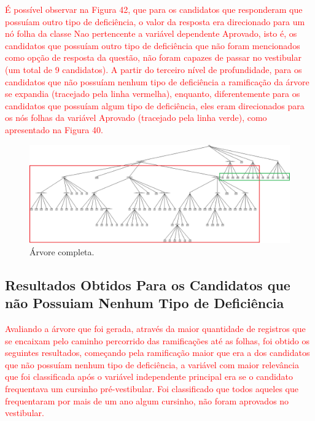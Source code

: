 \par
\textcolor{red}{É possível observar na Figura 42, que para os candidatos que responderam que possuíam outro tipo de deficiência, o valor da resposta era direcionado para um nó folha da classe Nao pertencente a variável dependente Aprovado, isto é, os candidatos que possuíam outro tipo de deficiência que não foram mencionados como opção de resposta da questão, não foram capazes de passar no vestibular (um total de 9 candidatos). A partir do terceiro nível de profundidade, para os candidatos que não possuíam nenhum tipo de deficiência a ramificação da árvore se expandia (tracejado pela linha vermelha), enquanto, diferentemente para os candidatos que possuíam algum tipo de deficiência, eles eram direcionados para os nós folhas da variável Aprovado (tracejado pela linha verde), como apresentado na Figura 40.}

\par
\begin{figure}[!htp]
	\begin{center}
    \caption{\label{fig:waveform_fig} Árvore completa.}
	\includegraphics[scale=0.45]{Figuras/Arvore_completa.png}
	\end{center}
\end{figure}


\subsection{Resultados Obtidos Para os Candidatos que não Possuiam Nenhum Tipo de Deficiência}


\par
\textcolor{red}{Avaliando a árvore que foi gerada, através da maior quantidade de registros que se encaixam pelo caminho percorrido das ramificações até as folhas, foi obtido os seguintes resultados, começando pela ramificação maior que era a dos candidatos que não possuíam nenhum tipo de deficiência, a variável com maior relevância que foi classificada após o variável independente principal era se o candidato frequentava um cursinho pré-vestibular. Foi classificado que todos aqueles que frequentaram por mais de um ano algum cursinho, não foram aprovados no vestibular.}

